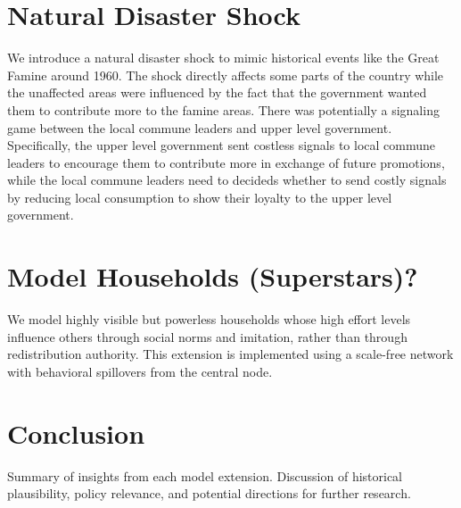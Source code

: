 \documentclass[12pt]{article}
\begin{document}
\section{Natural Disaster Shock}
We introduce a natural disaster shock to mimic historical events like the Great Famine around 1960. The shock directly affects some parts of the country while the unaffected areas were influenced by the fact that the government wanted them to contribute more to the famine areas. There was potentially a signaling game between the local commune leaders and upper level government. Specifically, the upper level government sent costless signals to local commune leaders to encourage them to contribute more in exchange of future promotions, while the local commune leaders need to decideds whether to send costly signals by reducing local consumption to show their loyalty to the upper level government.

\section{Model Households (Superstars)?}
We model highly visible but powerless households whose high effort levels influence others through social norms and imitation, rather than through redistribution authority. This extension is implemented using a scale-free network with behavioral spillovers from the central node.

\section{Conclusion}
Summary of insights from each model extension. Discussion of historical plausibility, policy relevance, and potential directions for further research.

  
\end{document}
